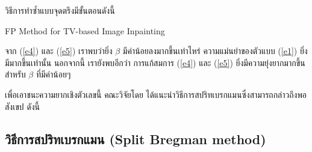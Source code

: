 \hspace{1cm}วิธีการทำซ้ำแบบจุดตรึงมีขั้นตอนดังนี้ \\
\vspace{0.5cm} 
\begin{algorithm}[H]
	\SetAlgoNoLine
	\caption{FP Method for TV-based Image Inpainting}	
\end{algorithm}
\vspace{0.5cm}
\hspace{1cm} จาก (\ref{e4}) และ (\ref{e5}) เราพบว่ายิ่ง $\beta$ มีค่าน้อยลงมากขึ้นเท่าไหร่ ความแม่นยำของตัวแบบ (\ref{e1}) ยิ่งมีมากขึ้นเท่านั้น นอกจากนี้ เรายังพบอีกว่า การแก้สมการ (\ref{e4}) และ (\ref{e5}) ยิ่งมีความยุ่งยากมากขึ้นสำหรับ $\beta$ ที่มีค่าน้อยๆ 

\hspace{1cm} เพื่อเอาชนะความยากเชิงตัวเลขนี้ คณะวิจัยโดย \cite{ref:splitbergman-inpaint} ได้แนะนำวิธีการสปริทเบรกแมนซึ่งสามารถกล่าวถึงพอสังเขป ดังนี้ \\

\subsection{วิธีการสปริทเบรกแมน (Split Bregman method)}

